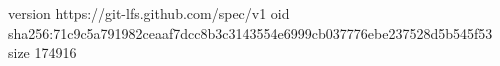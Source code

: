 version https://git-lfs.github.com/spec/v1
oid sha256:71c9c5a791982ceaaf7dcc8b3c3143554e6999cb037776ebe237528d5b545f53
size 174916

